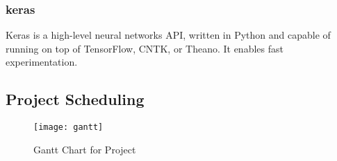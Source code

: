 \subsubsection{keras}

Keras is a high-level neural networks API, written in Python and capable of running on top of TensorFlow, CNTK, or Theano. It enables  fast experimentation.

\subsection{Project Scheduling}

\begin{figure}[H]
	\begin{center}
		
		\texttt{[image: gantt]}
		\caption{Gantt Chart for Project}
	\end{center}
\end{figure}
